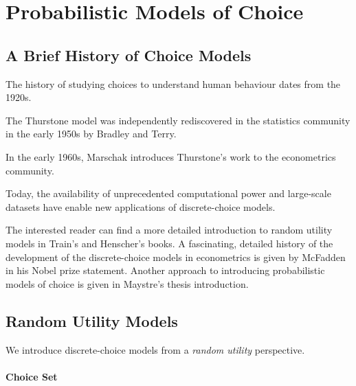 \section{Probabilistic Models of Choice}
\label{in:sec:models}

\subsection{A Brief History of Choice Models}

The history of studying choices to understand human behaviour dates from the 1920s.

The Thurstone model was independently rediscovered in the statistics community in the early 1950s by Bradley and Terry.

In the early 1960s, Marschak introduces Thurstone's work to the econometrics community.

Today, the availability of unprecedented computational power and large-scale datasets have enable new applications of discrete-choice models.

The interested reader can find a more detailed introduction to random utility models in Train's and Henscher's books.
A fascinating, detailed history of the development of the discrete-choice models in econometrics is given by McFadden in his Nobel prize statement.
Another approach to introducing probabilistic models of choice is given in Maystre's thesis introduction.

\subsection{Random Utility Models}

We introduce discrete-choice models from a \emph{random utility} perspective.

\paragraph{Choice Set}

